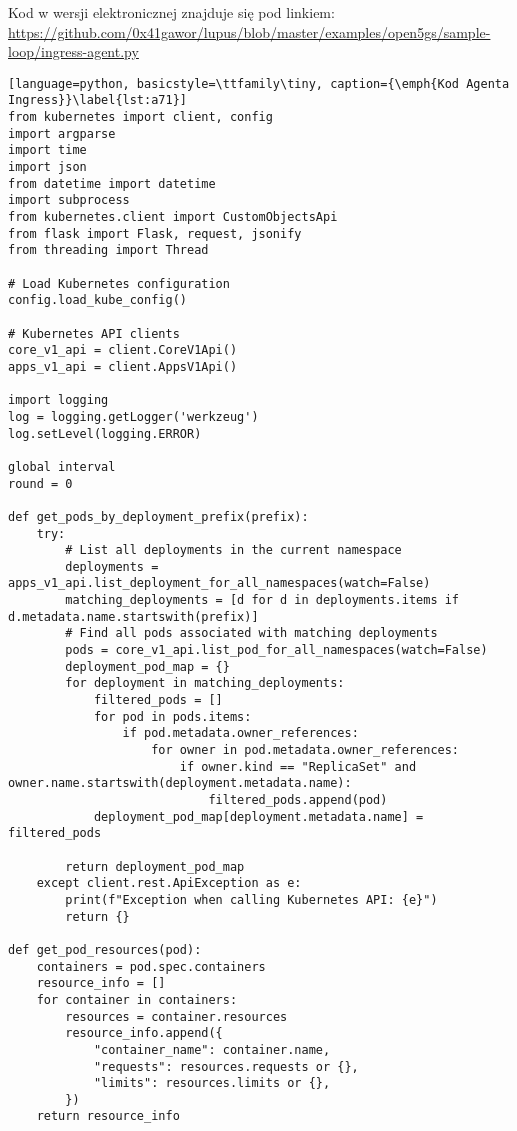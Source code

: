 \hypertarget{appendix:7}{}

Kod w wersji elektronicznej znajduje się pod linkiem: \url{https://github.com/0x41gawor/lupus/blob/master/examples/open5gs/sample-loop/ingress-agent.py}

\begin{lstlisting}[language=python, basicstyle=\ttfamily\tiny, caption={\emph{Kod Agenta Ingress}}\label{lst:a71}]
from kubernetes import client, config
import argparse
import time
import json
from datetime import datetime
import subprocess  
from kubernetes.client import CustomObjectsApi  
from flask import Flask, request, jsonify
from threading import Thread

# Load Kubernetes configuration
config.load_kube_config()

# Kubernetes API clients
core_v1_api = client.CoreV1Api()
apps_v1_api = client.AppsV1Api()

import logging
log = logging.getLogger('werkzeug')
log.setLevel(logging.ERROR)

global interval
round = 0

def get_pods_by_deployment_prefix(prefix):
    try:
        # List all deployments in the current namespace
        deployments = apps_v1_api.list_deployment_for_all_namespaces(watch=False)
        matching_deployments = [d for d in deployments.items if d.metadata.name.startswith(prefix)]
        # Find all pods associated with matching deployments
        pods = core_v1_api.list_pod_for_all_namespaces(watch=False)
        deployment_pod_map = {}
        for deployment in matching_deployments:
            filtered_pods = []
            for pod in pods.items:
                if pod.metadata.owner_references:
                    for owner in pod.metadata.owner_references:
                        if owner.kind == "ReplicaSet" and owner.name.startswith(deployment.metadata.name):
                            filtered_pods.append(pod)
            deployment_pod_map[deployment.metadata.name] = filtered_pods
        
        return deployment_pod_map
    except client.rest.ApiException as e:
        print(f"Exception when calling Kubernetes API: {e}")
        return {}

def get_pod_resources(pod):
    containers = pod.spec.containers
    resource_info = []
    for container in containers:
        resources = container.resources
        resource_info.append({
            "container_name": container.name,
            "requests": resources.requests or {},
            "limits": resources.limits or {},
        })
    return resource_info


\end{lstlisting}
